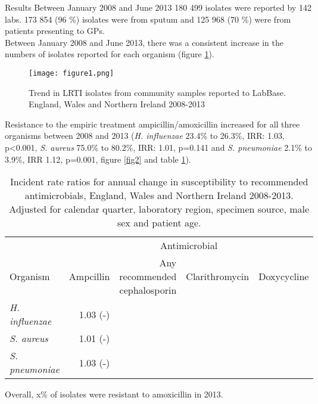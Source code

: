 \documentclass[final]{beamer}
\begin{document}
\begin{frame}
\begin{columns}[t]
    \begin{block}{Results}
   Between January 2008 and June 2013 180 499 isolates were reported by 142 labs. 
   173 854 (96 \%) isolates were from sputum and 125 968 (70 \%) were from patients presenting to GPs. \\
   Between January 2008 and June 2013, there was a consistent increase in the numbers of isolates reported for each organism (figure \ref{fig1}).
   \begin{figure}
   \texttt{[image: figure1.png]}
   \caption{Trend in LRTI isolates from community samples reported to LabBase. England, Wales and Northern Ireland 2008-2013}
   \label{fig1}
   \end{figure}
   Resistance to the empiric treatment ampicillin/amoxicillin increased for all three organisms between 2008 and 2013 (\textit{H. influenzae} 23.4\% to 26.3\%, IRR: 1.03, p\textless0.001, \textit{S. aureus} 75.0\% to 80.2\%, IRR: 1.01, p=0.141 and \textit{S. pneumoniae} 2.1\% to 3.9\%, IRR 1.12, p=0.001, figure \ref{fig2} and table \ref{table1}).\\
   \vspace{1 cm}
   \begin{table}
   \centering
   \begin{tabular}{lrrrr}
   \toprule
    & \multicolumn{4}{c}{Antimicrobial}\\
    \cline{2-5}
   Organism & Ampcillin & \shortstack{Any recommended \\ cephalosporin} & Clarithromycin & Doxycycline\\
   \midrule
	   \textit{H. influenzae} & 1.03 (-) & & & \\
	   \textit{S. aureus} & 1.01 (-) & & & \\
	   \textit{S. pneumoniae} & 1.03 (-) & & & \\
   \bottomrule
   \end{tabular}
   \caption{Incident rate ratios for annual change in susceptibility to recommended antimicrobials, England, Wales and Northern Ireland 2008-2013.
   Adjusted for calendar quarter, laboratory region, specimen source, male sex and patient age.}
   \label{table1}
   \end{table}
\vspace{1 cm}
   Overall, x\% of isolates were resistant to amoxicillin in 2013. %
  \end{block}
  

\end{columns}
\end{frame}
\end{document}
